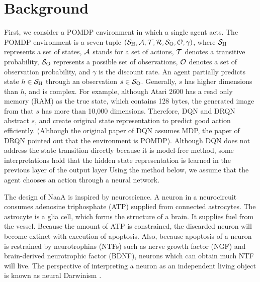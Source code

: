 \section{Background}
First, we consider a POMDP environment in which a single agent acts.
The POMDP environment is a seven-tuple $(\S, \A, \Trans, \R, \Observations, \ObProb, \gamma)$,
where $\S$ represents a set of states, $\A$ stands for a set of actions, $\Trans$ denotes a transitive probability, 
$\Observations$ represents a possible set of observations, $\ObProb$ denotes a set of observation probability, and
$\gamma$ is the discount rate.
An agent partially predicts state $h \in \S$ through an observation $s \in \Observations$.
Generally, $s$ has higher dimensions than $h$, and is complex.
For example, although Atari 2600 has a read only memory (RAM) as the true state, which contains 128 bytes,
the generated image from that $s$ has more than 10,000 dimensions.
Therefore, DQN and DRQN abstract $s$, and create original state representation to predict good action efficiently.
(Although the original paper of DQN assumes MDP, the paper of DRQN pointed out that the environment is POMDP).
Although DQN does not address the state transition directly because it is model-free method, 
some interpretations hold that the hidden state representation is learned in the previous layer of the output layer \citep{zahavy2016graying}
Using the method below, we assume that the agent chooses an action through a neural network.


The design of NaaA is inspired by neuroscience.
A neuron in a neurocircuit consumes adenosine triphosphate (ATP) supplied from connected astrocytes.
The astrocyte is a glia cell, which forms the structure of a brain. It supplies fuel from the vessel.
Because the amount of ATP is constrained, the discarded neuron will become extinct with execution of apoptosis.
Also, because apoptosis of a neuron is restrained by neurotrophins (NTFs) such as nerve growth factor (NGF) and brain-derived neurotrophic factor (BDNF),
neurons which can obtain much NTF will live.
The perspective of interpreting a neuron as an independent living object is known as neural Darwinism \citep{edelman1987neural}.
